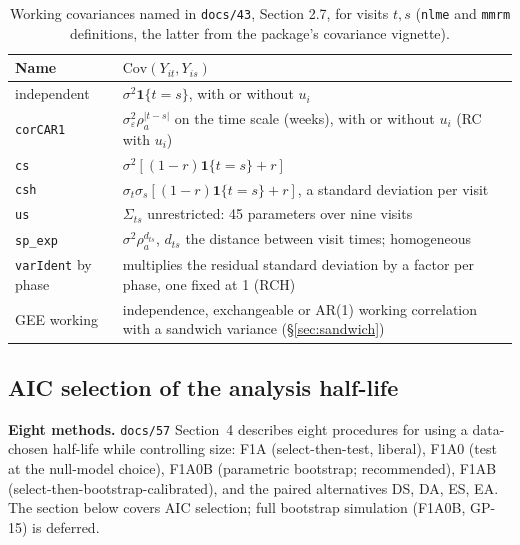\documentclass[11pt]{article}
\newcommand{\code}[1]{\texttt{#1}}
\begin{document}
\begin{table}[h]
\centering\small
\caption{Working covariances named in \code{docs/43}, Section 2.7, for
visits $t, s$ (\code{nlme} and \code{mmrm} definitions, the latter from
the package's covariance vignette).}
\label{tab:invd-wcov}
\begin{tabular}{@{}lp{9.6cm}@{}}
\toprule
Name & $\mathrm{Cov}(Y_{it}, Y_{is})$ \\
\midrule
independent & $\sigma^2\mathbf 1\{t = s\}$, with or without $u_i$ \\
\code{corCAR1} & $\sigma_\varepsilon^2 \rho_a^{|t - s|}$ on the time scale (weeks), with or without $u_i$ (RC with $u_i$) \\
\code{cs} & $\sigma^2[(1 - r)\mathbf 1\{t = s\} + r]$ \\
\code{csh} & $\sigma_t\sigma_s[(1 - r)\mathbf 1\{t = s\} + r]$, a standard deviation per visit \\
\code{us} & $\Sigma_{ts}$ unrestricted: 45 parameters over nine visits \\
\code{sp\_exp} & $\sigma^2 \rho_a^{d_{ts}}$, $d_{ts}$ the distance between visit times; homogeneous \\
\code{varIdent} by phase & multiplies the residual standard deviation by a factor per phase, one fixed at 1 (RCH) \\
GEE working & independence, exchangeable or AR(1) working correlation with a sandwich variance (\S\ref{sec:sandwich}) \\
\bottomrule
\end{tabular}
\end{table}

\subsection{AIC selection of the analysis half-life}
\label{sec:invd-aic}

\noindent\textbf{Eight methods.} \code{docs/57} Section~4 describes
eight procedures for using a data-chosen half-life while controlling
size: F1A (select-then-test, liberal), F1A0 (test at the null-model
choice), F1A0B (parametric bootstrap; recommended), F1AB
(select-then-bootstrap-calibrated), and the paired alternatives DS,
DA, ES, EA. The section below covers AIC selection; full bootstrap
simulation (F1A0B, GP-15) is deferred.
\end{document}
